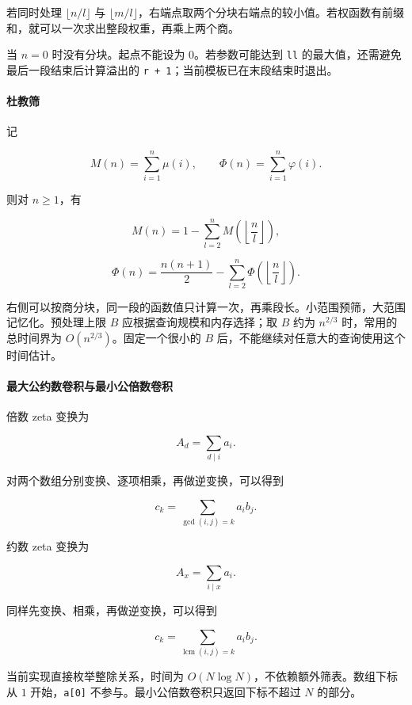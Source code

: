 若同时处理 \(\lfloor n/l\rfloor\) 与 \(\lfloor m/l\rfloor\)，右端点取两个分块右端点的较小值。若权函数有前缀和，就可以一次求出整段权重，再乘上两个商。

当 \(n=0\) 时没有分块。起点不能设为 \(0\)。若参数可能达到 \passthrough{\lstinline!ll!} 的最大值，还需避免最后一段结束后计算溢出的 \passthrough{\lstinline!r + 1!}；当前模板已在末段结束时退出。

\hypertarget{ux675cux6559ux7b5b}{%
\paragraph{杜教筛}\label{ux675cux6559ux7b5b}}

记

\[
M(n)=\sum_{i=1}^{n}\mu(i),\qquad
\Phi(n)=\sum_{i=1}^{n}\varphi(i).
\]

则对 \(n\ge1\)，有

\[
M(n)=1-\sum_{l=2}^{n}M\left(\left\lfloor\frac{n}{l}\right\rfloor\right),
\]

\[
\Phi(n)=\frac{n(n+1)}{2}
-\sum_{l=2}^{n}\Phi\left(\left\lfloor\frac{n}{l}\right\rfloor\right).
\]

右侧可以按商分块，同一段的函数值只计算一次，再乘段长。小范围预筛，大范围记忆化。预处理上限 \(B\) 应根据查询规模和内存选择；取 \(B\) 约为 \(n^{2/3}\) 时，常用的总时间界为 \(O(n^{2/3})\)。固定一个很小的 \(B\) 后，不能继续对任意大的查询使用这个时间估计。

\hypertarget{ux6700ux5927ux516cux7ea6ux6570ux5377ux79efux4e0eux6700ux5c0fux516cux500dux6570ux5377ux79ef}{%
\paragraph{最大公约数卷积与最小公倍数卷积}\label{ux6700ux5927ux516cux7ea6ux6570ux5377ux79efux4e0eux6700ux5c0fux516cux500dux6570ux5377ux79ef}}

倍数 zeta 变换为

\[
A_d=\sum_{d\mid i}a_i.
\]

对两个数组分别变换、逐项相乘，再做逆变换，可以得到

\[
c_k=\sum_{\gcd(i,j)=k}a_i b_j.
\]

约数 zeta 变换为

\[
A_x=\sum_{i\mid x}a_i.
\]

同样先变换、相乘，再做逆变换，可以得到

\[
c_k=\sum_{\operatorname{lcm}(i,j)=k}a_i b_j.
\]

当前实现直接枚举整除关系，时间为 \(O(N\log N)\)，不依赖额外筛表。数组下标从 \(1\) 开始，\passthrough{\lstinline!a[0]!} 不参与。最小公倍数卷积只返回下标不超过 \(N\) 的部分。

